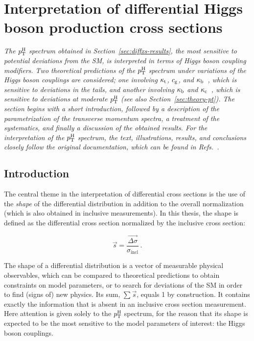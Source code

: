 \section{Interpretation of differential Higgs boson production cross sections}
\label{sec:interpretation}

\emph{%
The $p_\mathrm{T}^\mathrm{H}$ spectrum obtained in Section~\ref{sec:diffxs-results}, the most sensitive to potential deviations from the SM, is interpreted in terms of Higgs boson coupling modifiers.
% 
Two theoretical predictions of the $p_\mathrm{T}^\mathrm{H}$ spectrum under variations of the Higgs boson couplings are considered; one involving $\kappa_{\mathrm{t}}$, $c_\mathrm{g}$, and $\kappa_{\mathrm{b}}$~\cite{Grazzini:2017szg,Grazzini:2016paz}, which is sensitive to deviations in the tails, and another involving $\kappa_{\mathrm{b}}$ and $\kappa_{\mathrm{c}}$~\cite{Bishara:2016jga}, which is sensitive to deviations at moderate $p_\mathrm{T}^\mathrm{H}$ (see also Section~\ref{sec:theory-pt}).
% 
The section begins with a short introduction, followed by a description of the parametrization of the transverse momentum spectra, a treatment of the systematics, and finally a discussion of the obtained results.
% 
For the interpretation of the $p_\mathrm{T}^\mathrm{H}$ spectrum, the text, illustrations, results, and conclusions closely follow the original documentation, which can be found in Refs.~\cite{AN-17-244,HIG-17-028}.
}


\subsection{Introduction}

The central theme in the interpretation of differential cross sections is the use of the \emph{shape} of the differential distribution in addition to the overall normalization (which is also obtained in inclusive measurements).
% 
In this thesis, the shape is defined as the differential cross section normalized by the inclusive cross section:
% 
\begin{linenomath*}
\begin{equation}
\label{eq:interpretation-shape}
\vec{s} = \frac{\vec{\Delta\sigma}}{\sigma_\text{incl}}
\,.
\end{equation}
\end{linenomath*}
% 
The shape of a differential distribution is a vector of measurable physical observables, which can be compared to theoretical predictions to obtain constraints on model parameters, or to search for deviations of the SM in order to find (signs of) new physics.
% 
Its sum, $\sum \vec{s}$, equals 1 by construction.
% 
It contains exactly the information that is absent in an inclusive cross section measurement.
% 
Here attention is given solely to the $p_\mathrm{T}^\mathrm{H}$ spectrum, for the reason that its shape is expected to be the most sensitive to the model parameters of interest: the Higgs boson couplings.


